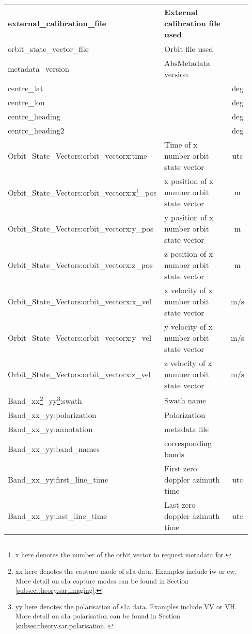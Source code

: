 \begin{longtable}[c]{|
>{\columncolor[HTML]{DADADA}}l |l|c|}
external\_calibration\_file & External calibration file used &  \\ \hline
orbit\_state\_vector\_file & Orbit file used &  \\ \hline
metadata\_version & AbsMetadata version &  \\ \hline
centre\_lat &  & deg \\ \hline
centre\_lon &  & deg \\ \hline
centre\_heading &  & deg \\ \hline
centre\_heading2 &  & deg \\ \hline
Orbit\_State\_Vectors:orbit\_vectorx:time & Time of x number orbit state vector & utc \\ \hline
Orbit\_State\_Vectors:orbit\_vectorx:x\footnote{x here denotes the number of the orbit vector to request metadata for.}\_pos & x position of x number orbit state vector & m \\ \hline
Orbit\_State\_Vectors:orbit\_vectorx:y\_pos & y position of x number orbit state vector & m \\ \hline
Orbit\_State\_Vectors:orbit\_vectorx:z\_pos & z position of x number orbit state vector & m \\ \hline
Orbit\_State\_Vectors:orbit\_vectorx:x\_vel & x velocity of x number orbit state vector & m/s \\ \hline
Orbit\_State\_Vectors:orbit\_vectorx:y\_vel & y velocity of x number orbit state vector & m/s \\ \hline
Orbit\_State\_Vectors:orbit\_vectorx:z\_vel & z velocity of x number orbit state vector & m/s \\ \hline
Band\_xx\footnote{xx here denotes the capture mode of \acs{s1a} data. Examples include \acs{iw} or \acs{ew}. More detail on \acs{s1a} capture modes can be found in Section \ref{subsec:theory.sar.imaging}.}\_yy\footnote{yy here denotes the polarisation of \acs{s1a} data. Examples include VV or VH. More detail on \acs{s1a} polarisation can be found in Section \ref{subsec:theory.sar.polarisation}.}:swath & Swath name &  \\ \hline
Band\_xx\_yy:polarization & Polarization &  \\ \hline
Band\_xx\_yy:annotation & metadata file &  \\ \hline
Band\_xx\_yy:band\_names & corresponding bands &  \\ \hline
Band\_xx\_yy:first\_line\_time & First zero doppler azimuth time & utc \\ \hline
Band\_xx\_yy:last\_line\_time & Last zero doppler azimuth time & utc \\ \hline

\end{longtable}
